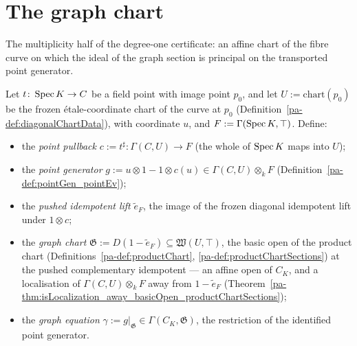 \section{The graph chart}
\label{pa-sec:graphChart}

The multiplicity half of the degree-one certificate: an affine chart of the fibre curve on
which the ideal of the graph section is principal on the transported point generator.

\begin{definition}
  \label{pa-def:graphChart}
  \leanok

  Let \(t \colon \operatorname{Spec} K \to C\) be a field point with image point \(p_0\), and let
  \(U := \mathrm{chart}(p_0)\) be the frozen \'etale-coordinate chart of the curve at
  \(p_0\) (Definition~\ref{pa-def:diagonalChartData}), with coordinate \(u\), and
  \(F := \Gamma(\operatorname{Spec} K, \top)\). Define:
  \begin{itemize}
  \item the \emph{point pullback} \(c := t^{\sharp} \colon \Gamma(C, U) \to F\) (the whole
    of \(\operatorname{Spec} K\) maps into \(U\));
  \item the \emph{point generator} \(g := u \otimes 1 - 1 \otimes c(u) \in
    \Gamma(C,U) \otimes_k F\) (Definition~\ref{pa-def:pointGen_pointEv});
  \item the \emph{pushed idempotent lift} \(\tilde e_F\), the image of the frozen diagonal
    idempotent lift under \(1 \otimes c\);
  \item the \emph{graph chart} \(\mathfrak G := D(1 - \tilde e_F) \subseteq
    \mathfrak W(U, \top)\), the basic open of the product chart
    (Definitions~\ref{pa-def:productChart}, \ref{pa-def:productChartSections}) at the pushed
    complementary idempotent — an affine open of \(C_K\), and a localisation of
    \(\Gamma(C,U) \otimes_k F\) away from \(1 - \tilde e_F\)
    (Theorem~\ref{pa-thm:isLocalization_away_basicOpen_productChartSections});
  \item the \emph{graph equation} \(\gamma := g|_{\mathfrak G} \in
    \Gamma(C_K, \mathfrak G)\), the restriction of the identified point generator.
  \end{itemize}
\end{definition}

